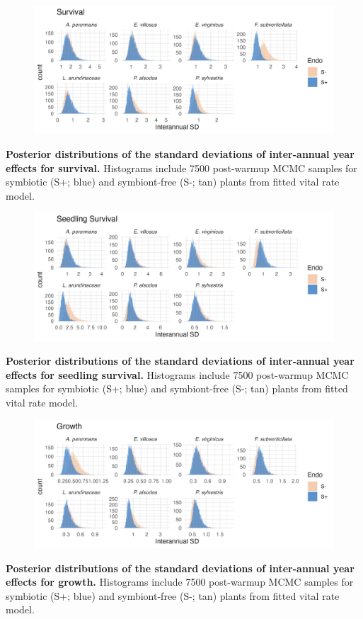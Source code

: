 \documentclass[12pt]{article}
\begin{document}
\begin{figure}[H]
	\centering
	\includegraphics[width=.9\linewidth]{surv_sigmayear_hist.png}
\end{figure}
 \textbf{Posterior distributions of the standard deviations of inter-annual year effects for survival.} Histograms include 7500 post-warmup MCMC samples for symbiotic (S+; blue) and symbiont-free (S-; tan) plants from fitted vital rate model.


\begin{figure}[H]
	\centering
	\includegraphics[width=.9\linewidth]{seedsurv_sigmayear_hist.png}
\end{figure}
 \textbf{Posterior distributions of the standard deviations of inter-annual year effects for seedling survival.} Histograms include 7500 post-warmup MCMC samples for symbiotic (S+; blue) and symbiont-free (S-; tan) plants from fitted vital rate model.
\newpage

\begin{figure}[H]
	\centering
	\includegraphics[width=.9\linewidth]{grow_sigmayear_hist.png}
\end{figure}
 \textbf{Posterior distributions of the standard deviations of inter-annual year effects for growth.} Histograms include 7500 post-warmup MCMC samples for symbiotic (S+; blue) and symbiont-free (S-; tan) plants from fitted vital rate model.
\end{document}
